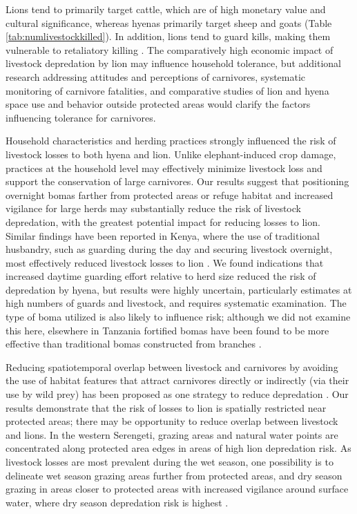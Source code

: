 \documentclass[12pt,]{article}
\begin{document}
Lions tend to primarily target cattle, which are of high monetary value and cultural significance, whereas hyenas primarily target sheep and goats (Table \ref{tab:numlivestockkilled}). In addition, lions tend to guard kills, making them vulnerable to retaliatory killing \citep{Beattie2020, Kissui2008}. The comparatively high economic impact of livestock depredation by lion may influence household tolerance, but additional research addressing attitudes and perceptions of carnivores, systematic monitoring of carnivore fatalities, and comparative studies of lion and hyena space use and behavior outside protected areas would clarify the factors influencing tolerance for carnivores.   

Household characteristics and herding practices strongly influenced the risk of livestock losses to both hyena and lion. Unlike elephant-induced crop damage, practices at the household level may effectively minimize livestock loss and support the conservation of large carnivores. Our results suggest that positioning overnight bomas farther from protected areas or refuge habitat and increased vigilance for large herds may substantially reduce the risk of livestock depredation, with the greatest potential impact for reducing losses to lion. Similar findings have been reported in Kenya, where the use of traditional husbandry, such as guarding during the day and securing livestock overnight, most effectively reduced livestock losses to lion \citep{Ogada2003}. We found indications that increased daytime guarding effort relative to herd size reduced the risk of depredation by hyena, but results were highly uncertain, particularly estimates at high numbers of guards and livestock, and requires systematic examination.  The type of boma utilized is also likely to influence risk; although we did not examine this here, elsewhere in Tanzania fortified bomas have been found to be more effective than traditional bomas constructed from branches \citep{Kissui2019, Mkonyi2017, Lichtenfeld2015}. 

Reducing spatiotemporal overlap between livestock and carnivores by avoiding the use of habitat features that attract carnivores directly or indirectly (via their use by wild prey) has been proposed as one strategy to reduce depredation \citep{Beattie2020,Petracca2019}. Our results demonstrate that the risk of losses to lion is spatially restricted near protected areas; there may be opportunity to reduce overlap between livestock and lions. In the western Serengeti, grazing areas and  natural water points are concentrated along protected area edges in areas of high lion depredation risk. As livestock losses are most prevalent during the wet season, one possibility is to delineate wet season grazing areas further from protected areas, and dry season grazing in areas closer to protected areas with increased vigilance around surface water, where dry season depredation risk is highest \citep{Beattie2020}.
\end{document}
